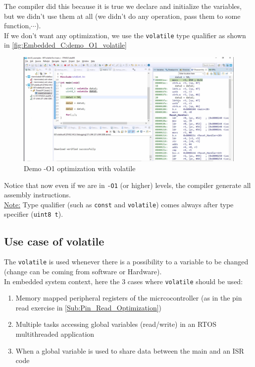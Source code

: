 The compiler did this because it is true we declare and initialize the variables, but we didn't use them at all (we didn't do any operation, pass them to some function,$\cdots$).\\


If we don't want any optimization, we use the \verb|volatile| type qualifier as shown in \autoref{fig:Embedded_C:demo_O1_volatile}

\begin{figure}[h]
\centering
\includegraphics[scale=0.7]{Figures/Embedded_C/demo_O1_volatile}
\caption{Demo -O1 optimization with volatile}
\label{fig:Embedded_C:demo_O1_volatile}
\end{figure} 

Notice that now even if we are in \verb|-O1| (or higher) levels, the compiler generate all assembly instructions.\\

\underline{Note:} Type qualifier (such as \verb|const| and \verb|volatile|) comes always after type specifier (\verb|uint8 t|).


\subsection{Use case of volatile}

The \verb|volatile| is used whenever there is a possibility to a variable to be changed (change can be coming from software or Hardware).\\

In embedded system context, here the 3 cases where \verb|volatile| should be used:

\begin{enumerate}
    \item Memory mapped peripheral registers of the micrcocontroller (as in the pin read exercise in \ref{Sub:Pin_Read_Optimization})
    
    \item Multiple tasks accessing global variables (read/write) in an RTOS multithreaded application
    
    \item When a global variable is used to share data between the main and an ISR code
    
\end{enumerate}

